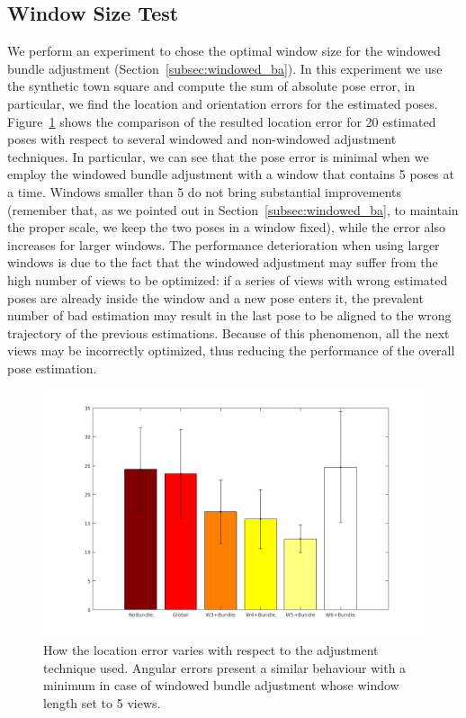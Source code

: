 \subsection{Window Size Test}
We perform an experiment to chose the optimal window size for the windowed
bundle adjustment (Section~\ref{subsec:windowed_ba}). In this experiment we
use the synthetic town square and compute the sum of absolute pose error, in
particular, we find the location and orientation errors for the estimated poses.
Figure~\ref{fig:sumAbsLocError} shows the comparison of the resulted location error for 20
estimated poses with respect to several windowed and non-windowed adjustment
techniques.
In particular, we can see that the pose error is minimal when we employ the
windowed bundle adjustment with a window that contains 5 poses at a time.
Windows smaller than 5 do not bring substantial improvements (remember that,
as we pointed out in Section~\ref{subsec:windowed_ba}, to maintain the proper scale, we keep the two poses
in a window fixed), while the error also increases
for larger windows. The performance deterioration when using larger windows
is due to the fact that the windowed adjustment may suffer from the high number
of views to be optimized: if a series of views with wrong estimated poses are
already inside the window and a new pose enters it, the prevalent number of
bad estimation may result in the last pose to be aligned to the wrong trajectory
of the previous estimations. Because of this phenomenon, all the next views
may be incorrectly optimized, thus reducing the performance of the overall
pose estimation.
%
\begin{figure}[h]
\centering
\includegraphics[width=\linewidth]{img/sumAbsLocError.png}
\caption{How the location error varies with respect to the adjustment technique
used. Angular errors present a similar behaviour with a minimum in case
of windowed bundle adjustment whose window length set to 5 views.}
\label{fig:sumAbsLocError}
\end{figure}

